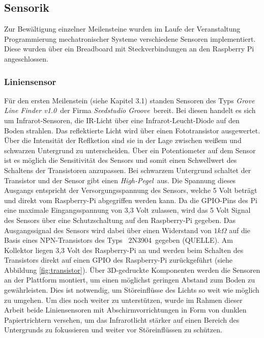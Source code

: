 \documentclass[12pt,a4paper,oneside]{article}
\begin{document}
\begin{spacing}{1.15}
\subsection{Sensorik}

Zur Bewältigung einzelner Meilensteine wurden im Laufe der Veranstaltung Programmierung mechatronischer Systeme verschiedene Sensoren implementiert. Diese wurden über ein Breadboard mit Steckverbindungen an den Raspberry Pi angeschlossen. 

\subsubsection{Liniensensor}

Für den ersten Meilenstein (siehe Kapitel 3.1) standen Sensoren des Typs \glqq \textit{Grove Line Finder v1.0}\grqq \ der Firma \glqq \textit{Seedstudio Groove}\grqq \ bereit. Bei diesen handelt es sich um Infrarot-Sensoren, die IR-Licht über eine Infrarot-Leucht-Diode auf den Boden strahlen. Das reflektierte Licht wird über einen Fototransistor ausgewertet. Über die Intensität der Reflketion sind sie in der Lage zwischen weißem und schwarzen Untergrund zu unterscheiden. Über ein Potentiometer auf dem Sensor ist es möglich die Sensitivität des Sensors und somit einen Schwellwert des Schaltens der Transistoren anzupassen. Bei schwarzem Untergrund schaltet der Transistor und der Sensor gibt einen \glqq \textit{High-Pegel}\grqq \ aus. Die Spannung dieses Ausgangs entspricht der Versorgungsspannung des Sensors, welche 5 Volt beträgt und direkt vom Raspberry-Pi abgegriffen werden kann. Da die GPIO-Pins des Pi eine maximale Eingangsspannung von 3,3 Volt zulassen, wird das 5 Volt Signal des Sensors über eine Schutzschaltung auf den Raspberry-Pi gegeben. Das Ausgangssignal des Sensors wird dabei über einen Widerstand von $1 k\Omega$ auf die Basis eines NPN-Transistors des Typs \glqq \ 2N3904\grqq \ gegeben (QUELLE). Am Kollektor liegen 3,3 Volt des Raspberry-Pi an und werden beim Schalten des Transistors direkt auf einen GPIO des Raspberry-Pi zurückgeführt (siehe Abbildung \ref{fig:transistor}). Über 3D-gedruckte Komponenten werden die Sensoren an der Plattform montiert, um einen möglichst geringen Abstand zum Boden zu gewährleisten. Dies ist notwendig, um Störeinflüsse des Lichts so weit wie möglich zu umgehen. Um dies noch weiter zu unterstützen, wurde im Rahmen dieser Arbeit beide Liniensensoren mit Abschirmvorrichtungen in Form von dunklen Papiertrichtern versehen, um das Infrarotlicht stärker auf einen Bereich des Untergrunds zu fokussieren und weiter vor Störeinflüssen zu schützen. 


\end{spacing}
\end{document}
